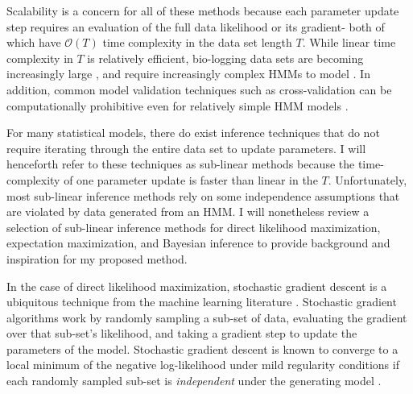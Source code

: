 
Scalability is a concern for all of these methods because each parameter update step requires an evaluation of the full data likelihood or its gradient- both of which have $\mathcal{O}(T)$ time complexity in the data set length $T$. While linear time complexity in $T$ is relatively efficient, bio-logging data sets are becoming increasingly large \citep{Patterson:2017}, and require increasingly complex HMMs to model \citep{Adam:2019}. In addition, common model validation techniques such as cross-validation can be computationally prohibitive even for relatively simple HMM models \citep{Pohle:2017}.


For many statistical models, there do exist inference techniques that do not require iterating through the entire data set to update parameters. I will henceforth refer to these techniques as sub-linear methods because the time-complexity of one parameter update is faster than linear in the $T$. Unfortunately, most sub-linear inference methods rely on some independence assumptions that are violated by data generated from an HMM. 
I will nonetheless review a selection of sub-linear inference methods for direct likelihood maximization, expectation maximization, and Bayesian inference to provide background and inspiration for my proposed method.

In the case of direct likelihood maximization, stochastic gradient descent is a ubiquitous technique from the machine learning literature \citep{Robbins:1951, Johnson:2013, Defazio:2014, Kingma:2014}. Stochastic gradient algorithms work by randomly sampling a sub-set of data, evaluating the gradient over that sub-set's likelihood, and taking a gradient step to update the parameters of the model. Stochastic gradient descent is known to converge to a local minimum of the negative log-likelihood under mild regularity conditions if each randomly sampled sub-set is \textit{independent} under the generating model \citep{Robbins:1951}.

